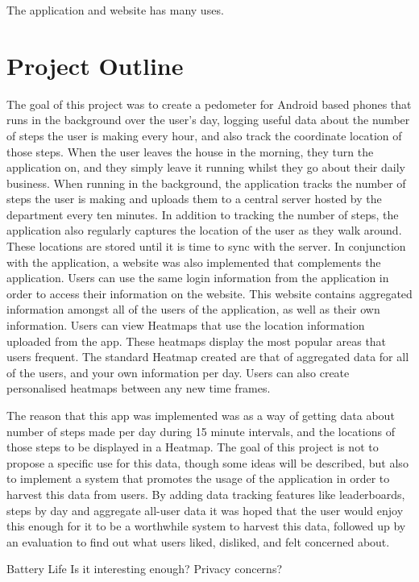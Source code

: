 \documentclass{l4proj}
\begin{document}
The application and website has many uses.

\section{Project Outline}

The goal of this project was to create a pedometer for Android based phones that runs in the background over the user's day, logging useful data about the number of steps the user is making every hour, and also track the coordinate location of those steps. When the user leaves the house in the morning, they turn the application on, and they simply leave it running whilst they go about their daily business. When running in the background, the application tracks the number of steps the user is making and uploads them to a central server hosted by the department every ten minutes. In addition to tracking the number of steps, the application also regularly captures the location of the user as they walk around. These locations are stored until it is time to sync with the server. In conjunction with the application, a website was also implemented that complements the application. Users can use the same login information from the application in order to access their information on the website. This website contains aggregated information amongst all of the users of the application, as well as their own information. Users can view Heatmaps that use the location information uploaded from the app. These heatmaps display the most popular areas that users frequent. The standard Heatmap created are that of aggregated data for all of the users, and your own information per day. Users can also create personalised heatmaps between any new time frames.

The reason that this app was implemented was as a way of getting data about number of steps made per day during 15 minute intervals, and the locations of those steps to be displayed in a Heatmap. The goal of this project is not to propose a specific use for this data, though some ideas will be described, but also to implement a system that promotes the usage of the application in order to harvest this data from users. By adding data tracking features like leaderboards, steps by day and aggregate all-user data it was hoped that the user would enjoy this enough for it to be a worthwhile system to harvest this data, followed up by an evaluation to find out what users liked, disliked, and felt concerned about. 

Battery Life
Is it interesting enough?
Privacy concerns?
\end{document}
